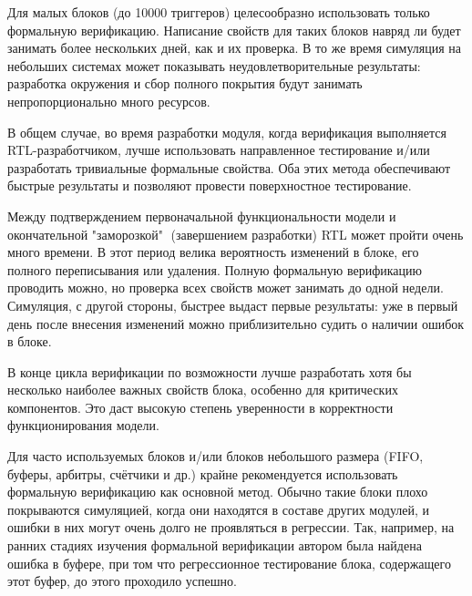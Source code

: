 Для малых блоков (до 10000 триггеров) целесообразно использовать только формальную верификацию. Написание свойств для таких блоков навряд ли будет занимать более нескольких дней, как и их проверка. В то же время симуляция на небольших системах может показывать неудовлетворительные результаты: разработка окружения и сбор полного покрытия будут занимать непропорционально много ресурсов. 

В общем случае, во время разработки модуля, когда верификация выполняется RTL-разработчиком, лучше использовать направленное тестирование и/или разработать тривиальные формальные свойства. Оба этих метода обеспечивают быстрые результаты и позволяют провести поверхностное тестирование. 

Между подтверждением первоначальной функциональности модели и окончательной "заморозкой" $\;$(завершением разработки) RTL может пройти очень много времени. В этот период велика вероятность изменений в блоке, его полного переписывания или удаления. Полную формальную верификацию проводить можно, но проверка всех свойств может занимать до одной недели. Симуляция, с другой стороны, быстрее выдаст первые результаты: уже в первый день после внесения изменений можно приблизительно судить о наличии ошибок в блоке.

В конце цикла верификации по возможности лучше разработать хотя бы несколько наиболее важных свойств блока, особенно для критических компонентов. Это даст высокую степень уверенности в корректности функционирования модели. 

Для часто используемых блоков и/или блоков небольшого размера (FIFO, буферы, арбитры, счётчики и др.) крайне рекомендуется использовать формальную верификацию как основной метод. Обычно такие блоки плохо покрываются симуляцией, когда они находятся в составе других модулей, и ошибки в них могут очень долго не проявляться в регрессии. Так, например, на ранних стадиях изучения формальной верификации автором была найдена ошибка в буфере, при том что регрессионное тестирование блока, содержащего этот буфер, до этого проходило успешно.
